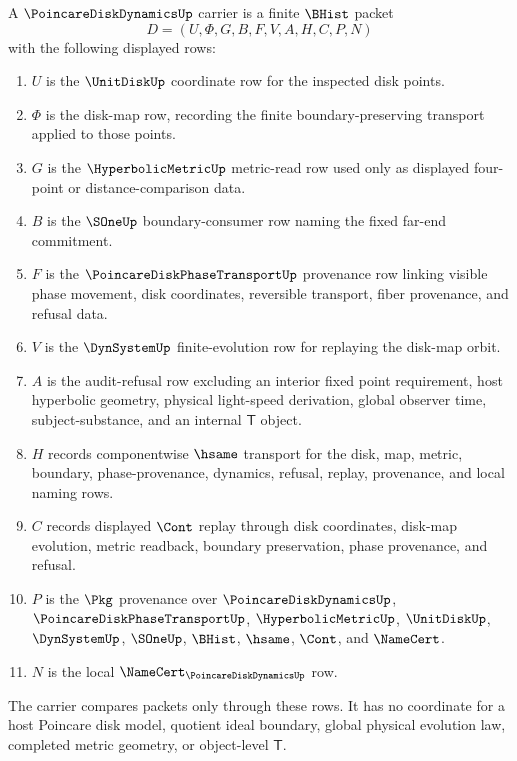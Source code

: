 \begin{definition}
\label{def:poincare-disk-dynamics-carrier}
A $\PoincareDiskDynamicsUp$ carrier is a finite $\BHist$ packet
$$
D=(U,\Phi,G,B,F,V,A,H,C,P,N)
$$
with the following displayed rows:
\begin{enumerate}
\item $U$ is the $\UnitDiskUp$ coordinate row for the inspected disk points.
\item $\Phi$ is the disk-map row, recording the finite boundary-preserving transport applied to those points.
\item $G$ is the $\HyperbolicMetricUp$ metric-read row used only as displayed four-point or distance-comparison data.
\item $B$ is the $\SOneUp$ boundary-consumer row naming the fixed far-end commitment.
\item $F$ is the $\PoincareDiskPhaseTransportUp$ provenance row linking visible phase movement, disk coordinates, reversible transport, fiber provenance, and refusal data.
\item $V$ is the $\DynSystemUp$ finite-evolution row for replaying the disk-map orbit.
\item $A$ is the audit-refusal row excluding an interior fixed point requirement, host hyperbolic geometry, physical light-speed derivation, global observer time, subject-substance, and an internal $\mathsf{T}$ object.
\item $H$ records componentwise $\hsame$ transport for the disk, map, metric, boundary, phase-provenance, dynamics, refusal, replay, provenance, and local naming rows.
\item $C$ records displayed $\Cont$ replay through disk coordinates, disk-map evolution, metric readback, boundary preservation, phase provenance, and refusal.
\item $P$ is the $\Pkg$ provenance over $\PoincareDiskDynamicsUp$, $\PoincareDiskPhaseTransportUp$, $\HyperbolicMetricUp$, $\UnitDiskUp$, $\DynSystemUp$, $\SOneUp$, $\BHist$, $\hsame$, $\Cont$, and $\NameCert$.
\item $N$ is the local $\NameCert_{\PoincareDiskDynamicsUp}$ row.
\end{enumerate}
The carrier compares packets only through these rows. It has no coordinate for a host Poincare disk model, quotient ideal boundary, global physical evolution law, completed metric geometry, or object-level $\mathsf{T}$.
\end{definition}

